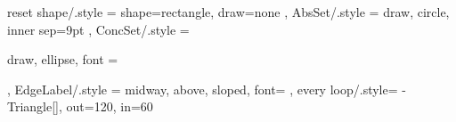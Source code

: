 \newcommand{\appref}[1]{Appendix \ref{#1}}
\newcommand{\fnref}[1]{Footnote \ref{#1}}

\newcommand*{\Boite}{\normalfont\ttfamily ▢}

\setlength{\epigraphwidth}{.618\textwidth}%
\tikzset
  {
    reset shape/.style = {
      shape=rectangle,
      draw=none
    },
    AbsSet/.style = {
      draw,
      circle,
      inner sep=9pt
    },
    ConcSet/.style = {
      draw,
      ellipse,
      font = {\itshape\strut}
    },
    EdgeLabel/.style = {
      midway,
      above,
      sloped,
      font=\small
    },
    every loop/.style={
        -{Triangle[]},
        out=120,
        in=60
    }
  }%

\newenvironment{langscibars}{\begin{axis}[ybar,xtick=data, xticklabels from table={\mydata}{pos},
        width  = \textwidth,
	height = .3\textheight,
    	nodes near coords,
	xtick=data,
	x tick label style={},
	ymin=0,
        ]}{\end{axis}}

\newcommand{\langscibar}[1]{\addplot+ table [x=i, y=#1] {\mydata};\addlegendentry{#1};}

\newcommand{\langscidata}[1]{\pgfplotstableread{#1}\mydata;}


\newcommand{\textstylePhono}[1]{#1}
\newcommand{\textstylePhonoApprofondissement}[1]{#1}
\newcommand{\textstylest}[1]{#1}
\newcommand{\textstyleTermes}[1]{\textsc{#1}}
\newcommand{\textstyleTermesapprof}[1]{\textsc{#1}}
\newcommand{\textstyleTermesapprofondissement}[1]{\textsc{#1}}

\newenvironment{styleExemplesuite}{}{}
\newenvironment{styleillustrationAFaire}{\begin{exe}\ex}{\end{exe}} %

\newenvironment{styleLivreImportant}{
\begin{mdframed}[style=tblsfilledbox,frametitle={}]
}{
\end{mdframed}
}

\newenvironment{styleTitreChapitre}{}{}
\newenvironment{styleTitrePartie}{}{}
\newenvironment{styleTitreSection}{}{}
\newenvironment{styleTitreSousSection}{}{}

\newenvironment{styleaprofondissementInterTitre}{\color{red}}{}

\newcommand{\gkchapter}[2]{#1: #2}
\newcommand{\gkboxsection}[3]{\section{#2~\texttt{[image: figures/gk-\#1.pdf]}}
    \marginpar{\texttt{[image: figures/gk-\#1.pdf]}}#3
    }
\renewcommand{\gkboxsection}[3]{\section{#2}#3}
\newcommand{\encadref}[1]{encadré~\ref{#1}}

